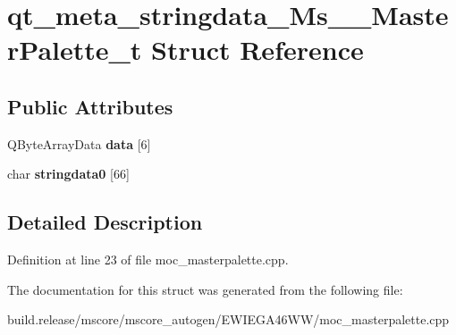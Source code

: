 \hypertarget{structqt__meta__stringdata___ms_____master_palette__t}{}\section{qt\+\_\+meta\+\_\+stringdata\+\_\+\+Ms\+\_\+\+\_\+\+Master\+Palette\+\_\+t Struct Reference}
\label{structqt__meta__stringdata___ms_____master_palette__t}
\subsection*{Public Attributes}
\begin{DoxyCompactItemize}
\item 
\mbox{\label{structqt__meta__stringdata___ms_____master_palette__t_a89eb4accd99c1b0b99f985f64f83ab10}} 
Q\+Byte\+Array\+Data {\bfseries data} \mbox{[}6\mbox{]}
\item 
\mbox{\label{structqt__meta__stringdata___ms_____master_palette__t_a8cc258e73cabb937bd8defaba4d57f7f}} 
char {\bfseries stringdata0} \mbox{[}66\mbox{]}
\end{DoxyCompactItemize}


\subsection{Detailed Description}


Definition at line 23 of file moc\+\_\+masterpalette.\+cpp.



The documentation for this struct was generated from the following file\+:\begin{DoxyCompactItemize}
\item 
build.\+release/mscore/mscore\+\_\+autogen/\+E\+W\+I\+E\+G\+A46\+W\+W/moc\+\_\+masterpalette.\+cpp\end{DoxyCompactItemize}
